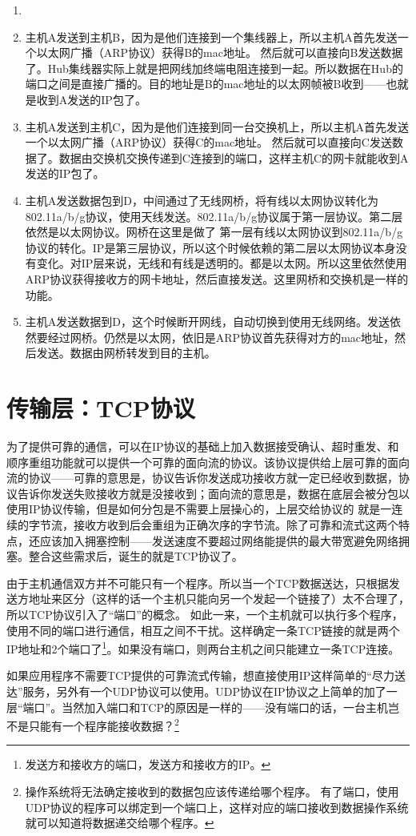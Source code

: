 \begin{enumerate}
\item [局域网（Hub集线器）] \item [局域网（带交换机）] 主机A发送到主机B，因为是他们连接到一个集线器上，所以主机A首先发送一个以太网广播（ARP协议）获得B的mac地址。
然后就可以直接向B发送数据了。Hub集线器实际上就是把网线加终端电阻连接到一起。所以数据在Hub的端口之间是直接广播的。目的地址是B的mac地址的以太网帧被B收到——也就是收到A发送的IP包了。

\item [局域网（带交换机）] 主机A发送到主机C，因为是他们连接到同一台交换机上，所以主机A首先发送一个以太网广播（ARP协议）获得C的mac地址。
然后就可以直接向C发送数据了。数据由交换机交换传递到C连接到的端口，这样主机C的网卡就能收到A发送的IP包了。

\item [局域网（无线网桥\footnote{简称AP。}）] 主机A发送数据包到D，中间通过了无线网桥，将有线以太网协议转化为802.11a/b/g协议，使用天线发送。802.11a/b/g协议属于第一层协议。第二层依然是以太网协议。网桥在这里是做了
第一层有线以太网协议到802.11a/b/g协议的转化。IP是第三层协议，所以这个时候依赖的第二层以太网协议本身没有变化。对IP层来说，无线和有线是透明的。都是以太网。所以这里依然使用ARP协议获得接收方的网卡地址，然后直接发送。这里网桥和交换机是一样的功能。

\item [局域网（无线到无线）] 主机A发送数据到D，这个时候断开网线，自动切换到使用无线网络。发送依然要经过网桥。仍然是以太网，依旧是ARP协议首先获得对方的mac地址，然后发送。数据由网桥转发到目的主机。

\end{enumerate}

\section{传输层：TCP协议}
为了提供可靠的通信，可以在IP协议的基础上加入数据接受确认、超时重发、和顺序重组功能就可以提供一个可靠的面向流的协议。该协议提供给上层可靠的面向流的协议——可靠的意思是，协议告诉你发送成功接收方就一定已经收到数据，协议告诉你发送失败接收方就是没接收到；面向流的意思是，数据在底层会被分包以使用IP协议传输，但是如何分包是不需要上层操心的，上层交给协议的 就是一连续的字节流，接收方收到后会重组为正确次序的字节流。除了可靠和流式这两个特点，还应该加入拥塞控制——发送速度不要超过网络能提供的最大带宽避免网络拥塞。整合这些需求后，诞生的就是TCP协议了。

由于主机通信双方并不可能只有一个程序。所以当一个TCP数据送达，只根据发送方地址来区分（这样的话一个主机只能向另一个发起一个链接了）太不合理了，所以TCP协议引入了“端口”的概念。
如此一来，一个主机就可以执行多个程序，使用不同的端口进行通信，相互之间不干扰。这样确定一条TCP链接的就是两个IP地址和2个端口了\footnote{发送方和接收方的端口，发送方和接收方的IP。}。如果没有端口，则两台主机之间只能建立一条TCP连接。

如果应用程序不需要TCP提供的可靠流式传输，想直接使用IP这样简单的“尽力送达”服务，另外有一个UDP协议可以使用。UDP协议在IP协议之上简单的加了一层“端口”。当然加入端口和TCP的原因是一样的——没有端口的话，一台主机岂不是只能有一个程序能接收数据？\footnote{操作系统将无法确定接收到的数据包应该传递给哪个程序。
有了端口，使用UDP协议的程序可以绑定到一个端口上，这样对应的端口接收到数据操作系统就可以知道将数据递交给哪个程序。}

